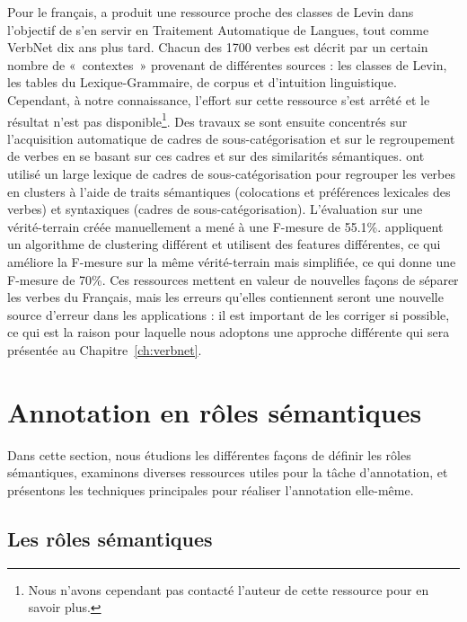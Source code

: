Pour le français, \cite{saintdizier1996constructing} a produit une ressource
proche des classes de Levin dans l'objectif de s'en servir en Traitement
Automatique de Langues, tout comme VerbNet dix ans plus tard. Chacun des 1700
verbes est décrit par un certain nombre de «~contextes~» provenant de
différentes sources : les classes de Levin, les tables du Lexique-Grammaire, de
corpus et d'intuition linguistique. Cependant, à notre connaissance, l'effort
sur cette ressource s'est arrêté et le résultat n'est pas
disponible\footnote{Nous n'avons cependant pas contacté l'auteur de cette
ressource pour en savoir plus.}. Des travaux se sont ensuite concentrés sur
l'acquisition automatique de cadres de sous-catégorisation et sur le
regroupement de verbes en se basant sur ces cadres et sur des similarités
sémantiques. \cite{sun2010investigating} ont utilisé un large lexique de cadres
de sous-catégorisation \citep{messiant2010acquisition} pour regrouper les
verbes en clusters à l'aide de traits sémantiques (colocations et préférences
lexicales des verbes) et syntaxiques (cadres de sous-catégorisation).
L'évaluation sur une vérité-terrain créée manuellement a mené à une F-mesure de
55.1\%.  \cite{falk2012classifying} appliquent un algorithme de clustering
différent et utilisent des features différentes, ce qui améliore la F-mesure
sur la même vérité-terrain mais simplifiée, ce qui donne une F-mesure de 70\%.
Ces ressources mettent en valeur de nouvelles façons de séparer les verbes du
Français, mais les erreurs qu'elles contiennent seront une nouvelle source
d'erreur dans les applications : il est important de les corriger si possible,
ce qui est la raison pour laquelle nous adoptons une approche différente qui
sera présentée au Chapitre~\ref{ch:verbnet}.

\section{Annotation en rôles sémantiques}
\label{sec:srl}

Dans cette section, nous étudions les différentes façons de définir les rôles
sémantiques, examinons diverses ressources utiles pour la tâche d'annotation,
et présentons les techniques principales pour réaliser l'annotation elle-même.

\subsection{Les rôles sémantiques}
\label{subsec:roles_semantiques}

